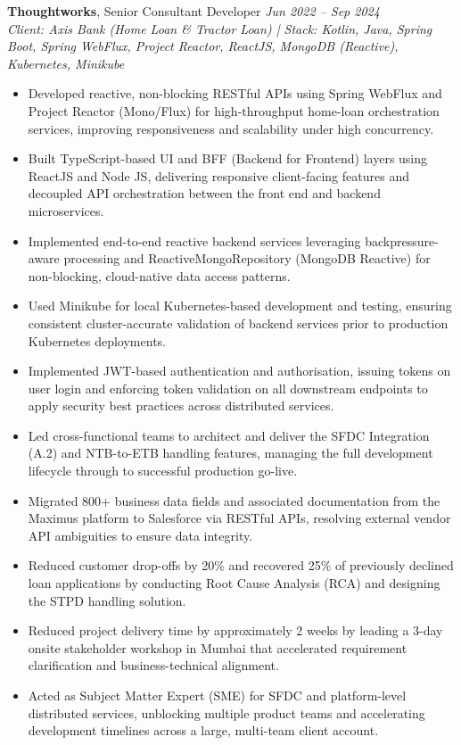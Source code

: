 \documentclass[a4paper,10pt]{article}
\begin{document}
\textbf{Thoughtworks}, Senior Consultant Developer \hfill \textit{Jun 2022 -- Sep 2024}\\
\textit{Client: Axis Bank (Home Loan \& Tractor Loan) | Stack: Kotlin, Java, Spring Boot, Spring WebFlux, Project Reactor, ReactJS, MongoDB (Reactive), Kubernetes, Minikube}
\begin{itemize}[leftmargin=1.5em, itemsep=0.01em]
  \item Developed reactive, non-blocking RESTful APIs using Spring WebFlux and Project Reactor (Mono/Flux) for high-throughput home-loan orchestration services, improving responsiveness and scalability under high concurrency.
  \item Built TypeScript-based UI and BFF (Backend for Frontend) layers using ReactJS and Node JS, delivering responsive client-facing features and decoupled API orchestration between the front end and backend microservices.
  \item Implemented end-to-end reactive backend services leveraging backpressure-aware processing and ReactiveMongoRepository (MongoDB Reactive) for non-blocking, cloud-native data access patterns.
  \item Used Minikube for local Kubernetes-based development and testing, ensuring consistent cluster-accurate validation of backend services prior to production Kubernetes deployments.
  \item Implemented JWT-based authentication and authorisation, issuing tokens on user login and enforcing token validation on all downstream endpoints to apply security best practices across distributed services.
  \item Led cross-functional teams to architect and deliver the SFDC Integration (A.2) and NTB-to-ETB handling features, managing the full development lifecycle through to successful production go-live.
  \item Migrated 800+ business data fields and associated documentation from the Maximus platform to Salesforce via RESTful APIs, resolving external vendor API ambiguities to ensure data integrity.
  \item Reduced customer drop-offs by 20\% and recovered 25\% of previously declined loan applications by conducting Root Cause Analysis (RCA) and designing the STPD handling solution.
  \item Reduced project delivery time by approximately 2 weeks by leading a 3-day onsite stakeholder workshop in Mumbai that accelerated requirement clarification and business-technical alignment.
  \item Acted as Subject Matter Expert (SME) for SFDC and platform-level distributed services, unblocking multiple product teams and accelerating development timelines across a large, multi-team client account.

\end{itemize}
\end{document}
